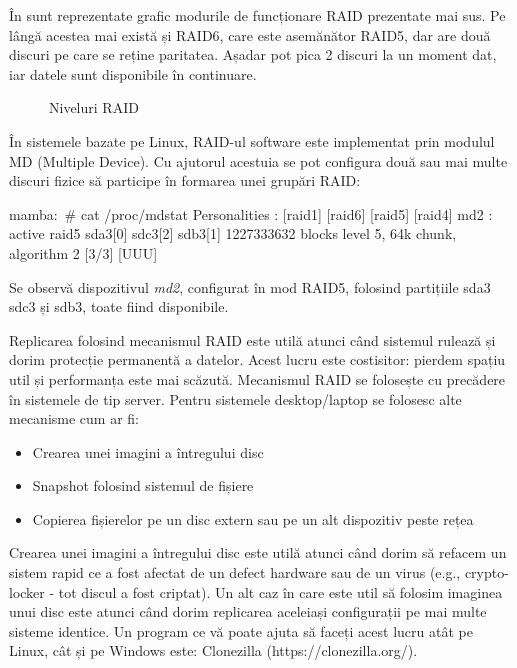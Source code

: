 În  sunt reprezentate grafic modurile de
funcționare RAID prezentate mai sus. Pe lângă acestea mai există și RAID6, care
este asemănător RAID5, dar are două discuri pe care se reține paritatea. Așadar
pot pica 2 discuri la un moment dat, iar datele sunt disponibile în continuare.

\begin{figure}[htbp]
	\centering
	\def\svgwidth{\columnwidth}
	
	\caption{Niveluri RAID}
	\label{fig:raid-types}
\end{figure}

În sistemele bazate pe Linux, RAID-ul software este implementat prin modulul MD
(Multiple Device). Cu ajutorul acestuia se pot configura două sau mai multe
discuri fizice să participe în formarea unei grupări RAID:

\begin{screen}
mamba:~# cat /proc/mdstat
Personalities : [raid1] [raid6] [raid5] [raid4]
md2 : active raid5 sda3[0] sdc3[2] sdb3[1]
      1227333632 blocks level 5, 64k chunk, algorithm 2 [3/3] [UUU]
\end{screen}


Se observă dispozitivul \textit{md2}, configurat în mod RAID5, folosind
partițiile sda3 sdc3 și sdb3, toate fiind disponibile.

Replicarea folosind mecanismul RAID este utilă atunci când sistemul rulează și
dorim protecție permanentă a datelor. Acest lucru este costisitor: pierdem
spațiu util și performanța este mai scăzută. Mecanismul RAID se folosește cu
precădere în sistemele de tip server. Pentru sistemele desktop/laptop se
folosesc alte mecanisme cum ar fi:

\begin{itemize}
	\item Crearea unei imagini a întregului disc
	\item Snapshot folosind sistemul de fișiere
	\item Copierea fișierelor pe un disc extern sau pe un alt dispozitiv
		peste rețea
\end{itemize}

Crearea unei imagini a întregului disc este utilă atunci când dorim să refacem
un sistem rapid ce a fost afectat de un defect hardware sau de un virus (e.g.,
crypto-locker - tot discul a fost criptat). Un alt caz în care este util să
folosim imaginea unui disc este atunci când dorim replicarea aceleiași
configurații pe mai multe sisteme identice. Un program ce vă poate ajuta să
faceți acest lucru atât pe Linux, cât și pe Windows este: Clonezilla
(https://clonezilla.org/).

